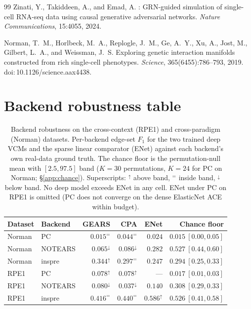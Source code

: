 \documentclass{article}
\theoremstyle{plain}
\theoremstyle{definition}
\theoremstyle{remark}
\begin{document}
\begin{thebibliography}{99}
Zinati, Y., Takiddeen, A., and Emad, A.
: {GRN}-guided simulation of single-cell {RNA}-seq data using causal generative adversarial networks.
\newblock \emph{Nature Communications}, 15:4055, 2024.

Norman, T.~M., Horlbeck, M.~A., Replogle, J.~M., Ge, A.~Y., Xu, A., Jost, M., Gilbert, L.~A., and Weissman, J.~S.
\newblock Exploring genetic interaction manifolds constructed from rich single-cell phenotypes.
\newblock \emph{Science}, 365(6455):786--793, 2019. doi:\,10.1126/science.aax4438.

\end{thebibliography}

\newpage
\appendix
\onecolumn

\section{Backend robustness table}
\label{app:backend-table}

\begin{table}[h]
\caption{Backend robustness on the cross-context (RPE1) and cross-paradigm (Norman) datasets. Per-backend edge-set $F_1$ for the two trained deep VCMs and the sparse linear comparator (ENet) against each backend's own real-data ground truth. The chance floor is the permutation-null mean with $[2.5, 97.5]$ band ($K{=}30$ permutations, $K{=}24$ for PC on Norman; \S\ref{app:chance}). Superscripts: $^{\uparrow}$ above band, $^{=}$ inside band, $^{\downarrow}$ below band. No deep model exceeds ENet in any cell. ENet under PC on RPE1 is omitted (PC does not converge on the dense ElasticNet ACE within budget).}
\label{tab:backend}
\vskip 0.1in
\centering
\small
\setlength{\tabcolsep}{4pt}
\begin{tabular}{llrrrr}
\toprule
\textbf{Dataset} & \textbf{Backend} & \textbf{GEARS} & \textbf{CPA} & \textbf{ENet} & \textbf{Chance floor} \\
\midrule
Norman & PC      & $0.015^{=}$          & $0.044^{=}$          & $0.024$          & $0.015\ [0.00,0.05]$ \\
Norman & NOTEARS & $0.065^{\downarrow}$ & $0.086^{\downarrow}$ & $0.282$          & $0.527\ [0.44,0.60]$ \\
Norman & inspre  & $0.344^{\uparrow}$   & $0.297^{=}$          & $0.247$          & $0.294\ [0.25,0.33]$ \\
RPE1   & PC      & $0.078^{\uparrow}$   & $0.078^{\uparrow}$   & ---              & $0.017\ [0.01,0.03]$ \\
RPE1   & NOTEARS & $0.080^{\downarrow}$ & $0.037^{\downarrow}$ & $0.140$          & $0.308\ [0.29,0.33]$ \\
RPE1   & inspre  & $0.416^{=}$          & $0.440^{=}$          & $0.586^{\uparrow}$ & $0.526\ [0.41,0.58]$ \\
\bottomrule
\end{tabular}
\end{table}
\end{document}
